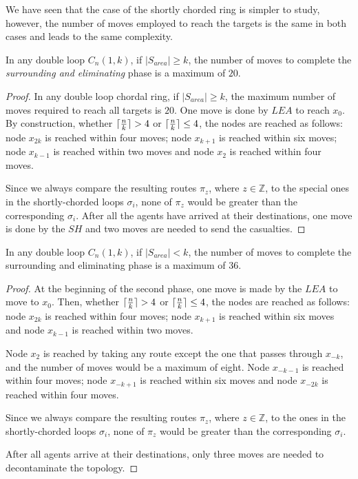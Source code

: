 We have seen that the case of the shortly chorded ring is simpler to study, however, the number of moves employed to reach the targets is the same in both cases and leads to the same complexity. 
 
 \begin{theorem}
In any double loop   $C_n(1,k)$,  if $\left\vert{S_{area}}\right\vert \ge k$,  
the number of moves to complete the  {\em surrounding  and eliminating} phase is a maximum of $20$.
\end{theorem}
 \begin{proof}
In any double loop chordal ring, if $\left\vert{S_{area}}\right\vert \ge k$, the maximum number of moves required to reach all targets is $20$.
One move is done by $LEA$ to reach $x_0$.
By construction, whether  $\lceil {n \over k} \rceil >  4$ or  $\lceil {n \over k} \rceil \leq  4$, the nodes are reached as follows: 
node $x_{2k}$ is reached within four moves; node $x_{k+1}$ is reached within six moves;
node $x_{k-1}$ is reached within two moves and node $x_{2}$ is reached within four moves.
 

Since we always compare the resulting routes $\pi_z$, where $z \in \mathbb{Z}$,  to the special ones in the shortly-chorded loops $\sigma_i$, none of $\pi_z$ would be greater than the corresponding $\sigma_i$. 
After all the agents have arrived at their destinations, one move is done by the $SH$ and two moves are needed to send the casualties.
 
\end{proof}

\begin{theorem}
In any double loop  $C_n(1,k)$,  if $\left\vert{S_{area}}\right\vert < k$, 
the number of moves to complete the surrounding and eliminating phase is a maximum of 36.
\end{theorem}

 \begin{proof}
At the beginning of the second phase, one move is made by the $LEA$ to move to $x_0$. Then, whether  $\lceil {n \over k} \rceil >  4$ or  $\lceil {n \over k} \rceil \leq  4$, the nodes are reached as follows: 
 node $x_{2k}$ is reached within four moves; node $x_{k+1}$ is reached within six moves and node $x_{k-1}$ is reached within two moves.
\item Node $x_{2}$ is reached by taking any route except the one that passes through $x_{-k}$, and the number of moves would be a maximum of eight. Node $x_{-k-1}$ is reached within four moves; node $x_{-k+1}$ is reached within six moves and node $x_{-2k}$ is reached within four moves.


Since we always compare the resulting routes $\pi_z$, where $z \in \mathbb{Z}$,  to the ones  in the shortly-chorded loops $\sigma_i$, none of $\pi_z$ would be greater than the corresponding $\sigma_i$. 

After all agents arrive at their destinations, only three moves are needed to decontaminate the topology.
 

\end{proof}


